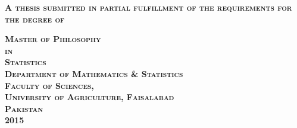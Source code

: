 \begin{titlepage}
\begin{center}
\vspace*{1cm}
\large{\textbf{\textsc{%
	A thesis submitted in partial fulfillment of the requirements for the degree of
}}}

	
\Large{\textbf{\textsc{%
Master of Philosophy\\
in \\
Statistics \\
\vspace*{1.2cm}
Department of Mathematics \& Statistics\\
Faculty of Sciences, \\
\vspace*{1.2cm}
University of Agriculture, Faisalabad\\
Pakistan\\
2015
}}}

\end{center}

\end{titlepage}